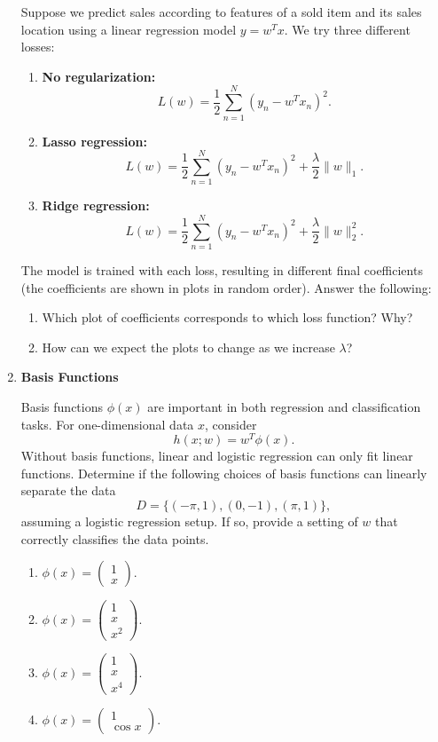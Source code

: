 \documentclass{article}
\begin{document}
\begin{enumerate}[label=\textbf{\arabic*.}]
    Suppose we predict sales according to features of a sold item and its sales location using a linear regression model $y = w^T x$. We try three different losses:
    \begin{enumerate}[label=(\alph*)]
        \item \textbf{No regularization:}
        \[
        L(w)=\frac{1}{2} \sum_{n=1}^N (y_n - w^T x_n)^2.
        \]
        \item \textbf{Lasso regression:}
        \[
        L(w)=\frac{1}{2} \sum_{n=1}^N (y_n - w^T x_n)^2 + \frac{\lambda}{2} \|w\|_1.
        \]
        \item \textbf{Ridge regression:}
        \[
        L(w)=\frac{1}{2} \sum_{n=1}^N (y_n - w^T x_n)^2 + \frac{\lambda}{2} \|w\|_2^2.
        \]
    \end{enumerate}
    The model is trained with each loss, resulting in different final coefficients (the coefficients are shown in plots in random order). Answer the following:
    \begin{enumerate}[label=(\alph*)]
        \item Which plot of coefficients corresponds to which loss function? Why?
        \item How can we expect the plots to change as we increase $\lambda$?
    \end{enumerate}

    \item \textbf{Basis Functions}

    Basis functions $\phi(x)$ are important in both regression and classification tasks. For one-dimensional data $x$, consider
    \[
    h(x;w)=w^T\phi(x).
    \]
    Without basis functions, linear and logistic regression can only fit linear functions. Determine if the following choices of basis functions can linearly separate the data
    \[
    D = \{(-\pi, 1), (0, -1), (\pi, 1)\},
    \]
    assuming a logistic regression setup. If so, provide a setting of $w$ that correctly classifies the data points.
    \begin{enumerate}[label=(\alph*)]
        \item $\phi(x)= \begin{pmatrix} 1 \\ x \end{pmatrix}$.
        \item $\phi(x)= \begin{pmatrix} 1 \\ x \\ x^2 \end{pmatrix}$.
        \item $\phi(x)= \begin{pmatrix} 1 \\ x \\ x^4 \end{pmatrix}$.
        \item $\phi(x)= \begin{pmatrix} 1 \\ \cos x \end{pmatrix}$.
    \end{enumerate}


\end{enumerate}
\end{document}
